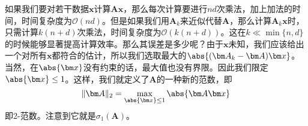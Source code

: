 \documentclass[UTF8]{ctexbook}
\newcommand{\Frobenius}[1]{\Vert #1 \Vert}
\begin{document}
	如果我们要对若干数据$\bm x$计算$\bm A \bm x$，那么每次计算要进行$nd$次乘法，加上加法的时间，时间复杂度为$\mathcal{O}(nd)$。但是如果我们用$\bm A_k$来近似代替$\bm A$，那么计算$\bm A_k \bm x$时，只需计算$k(n+d)$次乘法，时间复杂度为$\mathcal{O}(k(n+d))$。这在$k \ll \min \{n, d\}$的时候能够显著提高计算效率。那么其误差是多少呢？由于$\bm x$未知，我们应该给出一个对所有$\bm x$都符合的估计，所以我们选取最大的$\abs{(\bm A_k - \bm A)\bm x}$。当然，在$\abs{\bm x}$没有约束的话，最大值也没有界限。因此我们限定$\abs{\bm x} \le 1$。这样，我们就定义了$\bm A$的一种新的范数，即
	\begin{equation}
		\Frobenius{\bm A}_2 = \max_{\abs{\bm x} \le 1}\abs{\bm A \bm x}
		\label{def:2-form}
	\end{equation}
	即2-范数。注意到它就是$\sigma_1(\bm A)$。
\end{document}
